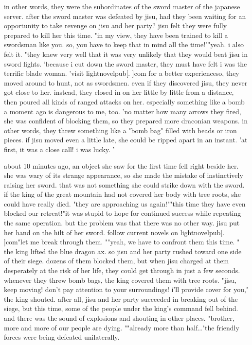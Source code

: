  in other words, they were the subordinates of the sword master of the japanese server.
after the sword master was defeated by jisu, had they been waiting for an opportunity to take revenge on jisu and her party? jisu felt they were fully prepared to kill her this time.
"in my view, they have been trained to kill a swordsman like you.
 so, you have to keep that in mind all the time!""yeah.
 i also felt it.
"they knew very well that it was very unlikely that they would beat jisu in sword fights.
'because i cut down the sword master, they must have felt i was the terrific blade woman.
'visit lightnovelpub[.
]com for a better experienceso, they moved around to hunt, not as swordsmen.
 even if they discovered jisu, they never got close to her.
 instead, they closed in on her little by little from a distance, then poured all kinds of ranged attacks on her.
especially something like a bomb a moment ago is dangerous to me, too.
'no matter how many arrows they fired, she was confident of blocking them, so they prepared more draconian weapons.
 in other words, they threw something like a "bomb bag" filled with beads or iron pieces.
 if jisu moved even a little late, she could be ripped apart in an instant.
 'at first, it was a close call! i was lucky.
'

about 10 minutes ago, an object she saw for the first time fell right beside her.
 she was wary of its strange appearance, so she made the mistake of instinctively raising her sword.
 that was not something she could strike down with the sword.
 if the king of the great mountain had not covered her body with tree roots, she could have really died.
"they are approaching us again!""this time they have even blocked our retreat!"it was stupid to hope for continued success while repeating the same operation.
 but the problem was that there was no other way.
 jisu put her hand on the hilt of her sword.
follow current novels on lightnovelpub[.
]com"let me break through them.
""yeah, we have to confront them this time.
" the king lifted the blue dragon ax.
so jisu and her party rushed toward one side of their siege.
 dozens of them blocked them, but when jisu charged at them desperately at the risk of her life, they could get through in just a few seconds.
 whenever they threw bomb bags, the king covered them with tree roots.
 "jisu, keep moving! don't pay attention to your surroundings! i'll provide cover for you," the king shouted.
after all, jisu and her party succeeded in breaking out of the siege, but this time, some of the people under the king's command fell behind.
 and there was the sound of explosions and shouting in other places.
"brother, more and more of our people are dying.
""already more than half…"the friendly forces were being defeated unilaterally.


 
